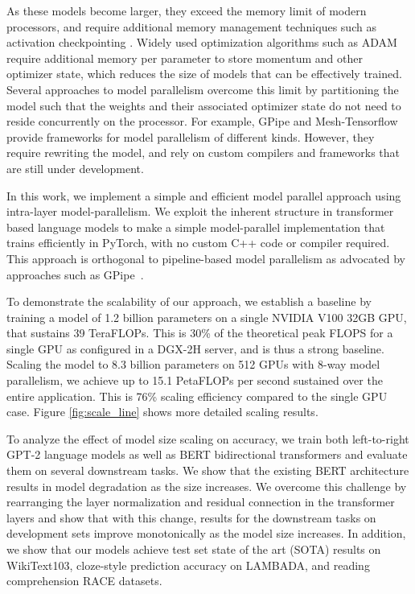 As these models become larger, they exceed the memory limit of modern processors, and require additional memory management techniques such as activation checkpointing \citep{activation_checkpointing}. Widely used optimization algorithms such as ADAM require additional memory per parameter to store momentum and other optimizer state, which reduces the size of models that can be effectively trained. Several approaches to model parallelism overcome this limit by partitioning the model such that the weights and their associated optimizer state do not need to reside concurrently on the processor. For example, GPipe \cite{GPipe} and Mesh-Tensorflow \cite{mesh_tf} provide frameworks for model parallelism of different kinds. However, they require rewriting the model, and rely on custom compilers and frameworks that are still under development.

In this work,  we implement a simple and efficient model parallel approach using intra-layer model-parallelism. We exploit the inherent structure in transformer based language models to make a simple model-parallel implementation that trains efficiently in PyTorch, with no custom C++ code or compiler required. This approach is orthogonal to pipeline-based model parallelism as advocated by approaches such as GPipe~\cite{GPipe}. 

To demonstrate the scalability of our approach, we establish a baseline by training a model of 1.2 billion parameters on a single NVIDIA V100 32GB GPU, that sustains 39 TeraFLOPs. This is 30\% of the theoretical peak FLOPS for a single GPU as configured in a DGX-2H server, and is thus a strong baseline. Scaling the model to 8.3 billion parameters on 512 GPUs with 8-way model parallelism, we achieve up to 15.1 PetaFLOPs per second sustained over the entire application. This is 76\% scaling efficiency compared to the single GPU case. Figure \ref{fig:scale_line} shows more detailed scaling results.

To analyze the effect of model size scaling on accuracy, we train both left-to-right GPT-2 \cite{Radford2019GPT2} language models as well as BERT \cite{devlin2018bert} bidirectional transformers and evaluate them on several downstream tasks. We show that the existing BERT architecture results in model degradation as the size increases. We overcome this challenge by rearranging the layer normalization and residual connection in the transformer layers and show that with this change, results for the downstream tasks  on development sets improve monotonically as the model size increases. In addition, we show that our models achieve test set state of the art (SOTA) results on WikiText103, cloze-style prediction accuracy on LAMBADA, and reading comprehension RACE datasets.

